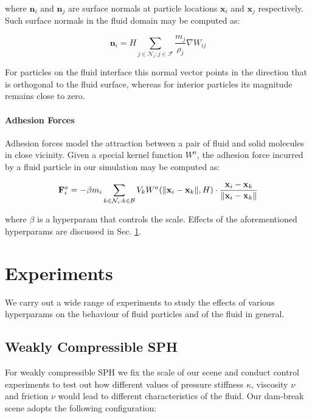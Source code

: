 \documentclass[
	11pt, 
	DIV10,
	ngerman,
	a4paper, 
	oneside, 
	headings=normal, 
	captions=tableheading,
	final, 
	numbers=noenddot
]{scrartcl}
\DeclarePairedDelimiter{\norm}{\lVert}{\rVert}
\begin{document}
where $ \mathbf{n}_{i} $ and $ \mathbf{n}_{j} $ are surface normals at particle locations $ \mathbf{x}_{i} $ and $ \mathbf{x}_{j} $ respectively. Such surface normals in the fluid domain may be computed as:

\begin{equation}
	\label{eq27}
	\mathbf{n}_{i} = H \sum_{j \in \mathcal{N}_{i}:j \in \mathcal{F}} \frac{m_{j}}{\rho_{j}} \nabla W_{ij}
\end{equation}

For particles on the fluid interface this normal vector points in the direction that is orthogonal to the fluid surface, whereas for interior particles its magnitude remains close to zero.

\paragraph{Adhesion Forces}

Adhesion forces model the attraction between a pair of fluid and solid molecules in close vicinity. Given a special kernel function $ W^{a} $, the adhesion force incurred by a fluid particle in our simulation may be computed as:

\begin{equation}
	\label{28}
	\mathbf{F}_{i}^{a} = - \beta m_{i} \sum_{k \in \mathcal{N}_{i}:k \in \mathcal{B}} V_{k} W^{a}(\norm{\mathbf{x}_{i} - \mathbf{x}_{k}}, H) \cdot \frac{\mathbf{x}_{i} - \mathbf{x}_{k}}{\norm{\mathbf{x}_{i} - \mathbf{x}_{k}}}
\end{equation}

where $ \beta $ is a hyperparam that controls the scale. Effects of the aforementioned hyperparams are discussed in Sec. \ref{sec4}.

\section{Experiments}
\label{sec4}

We carry out a wide range of experiments to study the effects of various hyperparams on the behaviour of fluid particles and of the fluid in general.

\subsection{Weakly Compressible SPH}

For weakly compressible SPH we fix the scale of our scene and conduct control experiments to test out how different values of pressure stiffness $ \kappa $, viscosity $ \nu $ and friction $ \nu$ would lead to different characteristics of the fluid. Our dam-break scene adopts the following configuration:
\end{document}
